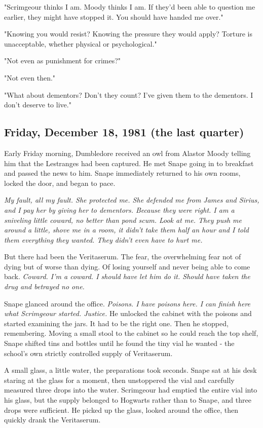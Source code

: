 "Scrimgeour thinks I am. Moody thinks I am. If they'd been able to question me earlier, they might have stopped it. You should have handed me over."

"Knowing you would resist? Knowing the pressure they would apply? Torture is unacceptable, whether physical or psychological."

"Not even as punishment for crimes?"

"Not even then."

"What about dementors? Don't they count? I've given them to the dementors. I don't deserve to live."

\subsection{Friday, December 18, 1981 (the last quarter)}

Early Friday morning, Dumbledore received an owl from Alastor Moody telling him that the Lestranges had been captured. He met Snape going in to breakfast and passed the news to him. Snape immediately returned to his own rooms, locked the door, and began to pace.

\emph{My fault, all my fault. She protected me. She defended me from James and Sirius, and I pay her by giving her to dementors. Because they were right. I am a sniveling little coward, no better than pond scum. Look at me. They push me around a little, shove me in a room, it didn't take them half an hour and I told them everything they wanted. They didn't even have to hurt me.}

But there had been the Veritaserum. The fear, the overwhelming fear not of dying but of worse than dying. Of losing yourself and never being able to come back. \emph{Coward. I'm a coward. I should have let him do it. Should have taken the drug and betrayed no one.}

Snape glanced around the office. \emph{Poisons. I have poisons here. I can finish here what Scrimgeour started. Justice.} He unlocked the cabinet with the poisons and started examining the jars. It had to be the right one. Then he stopped, remembering. Moving a small stool to the cabinet so he could reach the top shelf, Snape shifted tins and bottles until he found the tiny vial he wanted - the school's own strictly controlled supply of Veritaserum.

A small glass, a little water, the preparations took seconds. Snape sat at his desk staring at the glass for a moment, then unstoppered the vial and carefully measured three drops into the water. Scrimgeour had emptied the entire vial into his glass, but the supply belonged to Hogwarts rather than to Snape, and three drops were sufficient. He picked up the glass, looked around the office, then quickly drank the Veritaserum.

